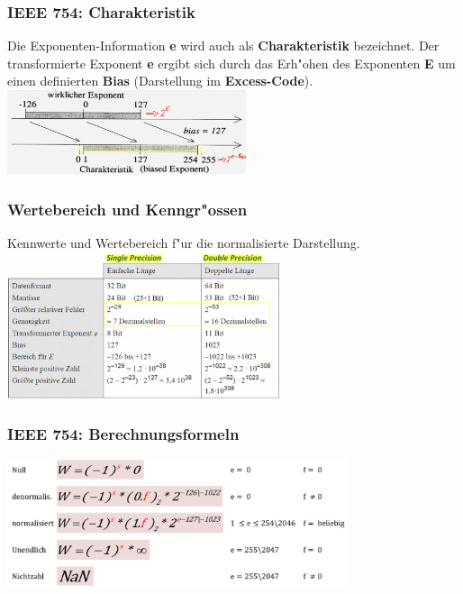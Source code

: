 \begin{minipage}[t]{9cm}
	\subsubsection{IEEE 754: Charakteristik}
	Die Exponenten-Information \color{red} \textbf{e} \color{black} wird auch als \textbf{Charakteristik} bezeichnet. Der transformierte Exponent \color{red} \textbf{e} \color{black} ergibt sich durch das Erh"ohen des Exponenten \textbf{E} um einen definierten \textbf{Bias} (Darstellung im \textbf{Excess-Code}).\\
	\includegraphics[width=7cm]{pics/IEEE-Exponent}
	\vspace{2ex}
	\subsubsection{Wertebereich und Kenngr"ossen}
	Kennwerte und Wertebereich f"ur die normalisierte Darstellung.\\
	\includegraphics[width=8cm]{pics/IEEE-Wertbereich}
	\vspace{2ex}
	\subsubsection{IEEE 754: Berechnungsformeln}
		\includegraphics[width = 10cm]{pics/IEEE-Berechnungsformel}

\end{minipage}
